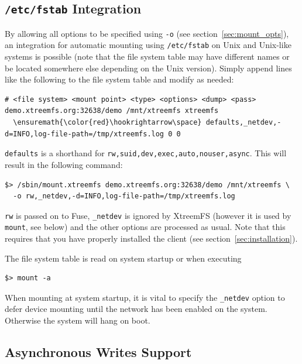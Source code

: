\documentclass[a4paper,10pt]{book}
\begin{document}
\subsection{\texttt{/etc/fstab} Integration}
\label{sec:mount_vol:fstab}

By allowing all options to be specified using \texttt{-o} (see section~\ref{sec:mount_opts}), an integration for automatic mounting using \texttt{/etc/fstab} on Unix and Unix-like systems is possible (note that the file system table may have different names or be located somewhere else depending on the Unix version). Simply append lines like the following to the file system table and modify as needed:
\begin{Verbatim}[commandchars=\\\{\}]
# <file system> <mount point> <type> <options> <dump> <pass>
demo.xtreemfs.org:32638/demo /mnt/xtreemfs xtreemfs
  \ensuremath{\color{red}\hookrightarrow\space} defaults,_netdev,-d=INFO,log-file-path=/tmp/xtreemfs.log 0 0
\end{Verbatim}
\texttt{defaults} is a shorthand for \texttt{rw,suid,dev,exec,auto,nouser,async}. This will result in the following command:
\begin{verbatim}
$> /sbin/mount.xtreemfs demo.xtreemfs.org:32638/demo /mnt/xtreemfs \
  -o rw,_netdev,-d=INFO,log-file-path=/tmp/xtreemfs.log
\end{verbatim}
\texttt{rw} is passed on to Fuse, \texttt{\_netdev} is ignored by XtreemFS (however it is used by \texttt{mount}, see below) and the other options are processed as usual. Note that this requires that you have properly installed the client (see section~\ref{sec:installation}).

The file system table is read on system startup or when executing
\begin{verbatim}
$> mount -a
\end{verbatim}
When mounting at system startup, it is vital to specify the \texttt{\_netdev} option to defer device mounting until the network has been enabled on the system. Otherwise the system will hang on boot.

\subsection{Asynchronous Writes Support}
\label{sec:async_writes}
\end{document}
